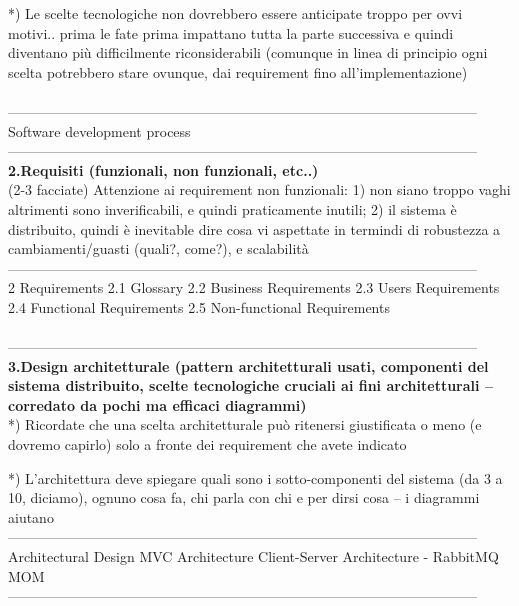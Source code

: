 \documentclass[10pt,english]{article}
\begin{document}
*) Le scelte tecnologiche non dovrebbero essere anticipate troppo per ovvi motivi.. prima le fate prima impattano tutta la parte successiva e quindi diventano più difficilmente riconsiderabili (comunque in linea di principio ogni scelta potrebbero stare ovunque, dai requirement fino all'implementazione) \\
\\-----------------------------------------------------------------------------------------------------\\
Software development process
\\-----------------------------------------------------------------------------------------------------\\
\textbf{2.Requisiti (funzionali, non funzionali, etc..)} \\
(2-3 facciate)
Attenzione ai requirement non funzionali: 1) non siano troppo vaghi altrimenti sono inverificabili, e quindi praticamente inutili; 2) il sistema è distribuito, quindi è inevitable dire cosa vi aspettate in termindi di robustezza a cambiamenti/guasti (quali?, come?), e scalabilità
\\-----------------------------------------------------------------------------------------------------\\

2 Requirements 
2.1 Glossary 
2.2 Business Requirements 
2.3 Users Requirements 
2.4 Functional Requirements
2.5 Non-functional Requirements \\
\\-----------------------------------------------------------------------------------------------------\\
\textbf{3.Design architetturale (pattern architetturali usati, componenti del sistema distribuito, scelte tecnologiche cruciali ai fini architetturali -- corredato da pochi ma efficaci diagrammi)} \\

*) Ricordate che una scelta architetturale può ritenersi giustificata o meno (e dovremo capirlo) solo a fronte dei requirement che avete indicato

*) L'architettura deve spiegare quali sono i sotto-componenti del sistema (da 3 a 10, diciamo), ognuno cosa fa, chi parla con chi e per dirsi cosa -- i diagrammi aiutano
\\-----------------------------------------------------------------------------------------------------\\
 Architectural Design
MVC Architecture
Client-Server Architecture
 - RabbitMQ MOM 
\\-----------------------------------------------------------------------------------------------------\\
\end{document}

